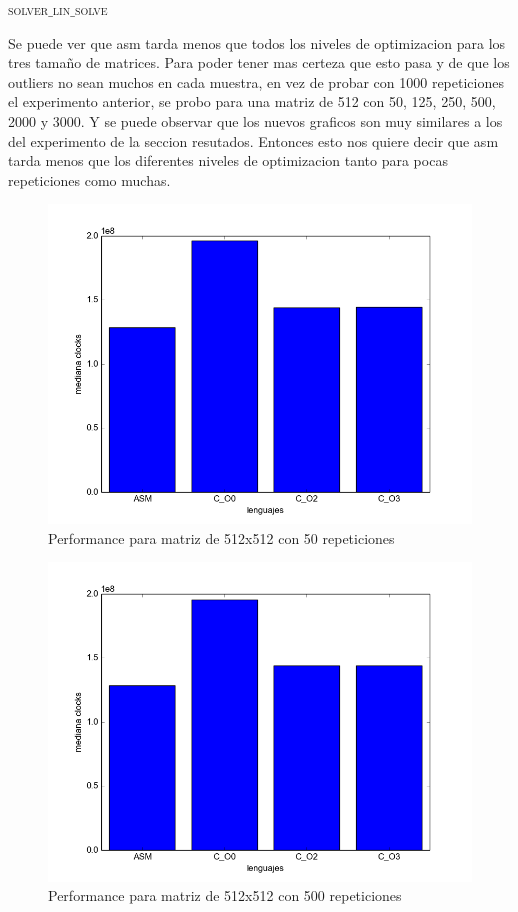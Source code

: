 {\scshape\Large solver$\_$lin$\_$solve\par}

Se puede ver que asm tarda menos que todos los niveles de optimizacion para los tres tamaño de matrices. Para poder tener mas certeza que esto pasa y de que los outliers no sean muchos en cada muestra, en vez de probar con 1000 repeticiones el experimento anterior, se probo para una matriz de 512 con 50, 125, 250, 500, 2000 y 3000. Y se puede observar que los nuevos graficos son muy similares a los del experimento de la seccion resutados. Entonces esto nos quiere decir que asm tarda menos que los diferentes niveles de optimizacion tanto para pocas repeticiones como muchas. 

\begin{figure}[h]
  \centering
  	\includegraphics[width=.6\linewidth]{Matriz_512_50.png}
  	\caption{Performance para matriz de 512x512 con 50 repeticiones}
  	\label{fig:M50it}
\end{figure}

\begin{figure}[h]
  \centering
  	\includegraphics[width=.6\linewidth]{Matriz_512_500.png}
  	\caption{Performance para matriz de 512x512 con 500 repeticiones}
  	\label{fig:M500it}
\end{figure}

